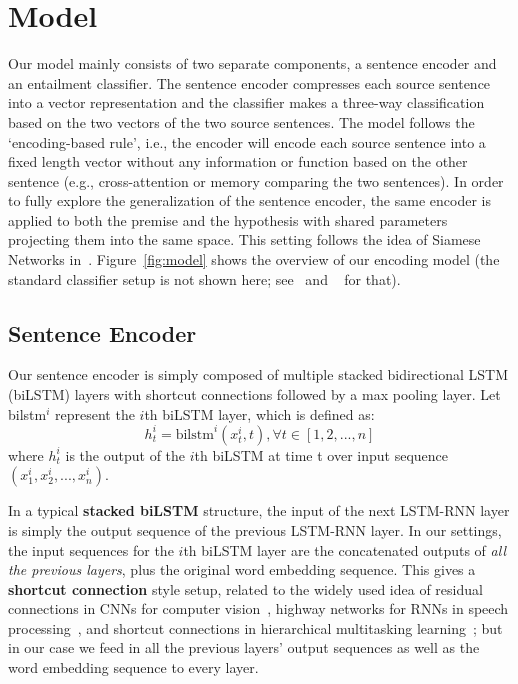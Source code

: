 \documentclass[11pt,letterpaper]{article}
\begin{document}

\section{Model}
Our model mainly consists of two separate components, a sentence encoder and an entailment classifier. The sentence encoder compresses each source sentence into a vector representation and the classifier makes a three-way classification based on the two vectors of the two source sentences. The model follows the `encoding-based rule', i.e., the encoder will encode each source sentence into a fixed length vector without any information or function based on the other sentence (e.g., cross-attention or memory comparing the two sentences). In order to fully explore the generalization of the sentence encoder, the same encoder is applied to both the premise and the hypothesis with shared parameters projecting them into the same space. This setting follows the idea of Siamese Networks in~. Figure~\ref{fig:model} shows the overview of our encoding model (the standard classifier setup is not shown here; see~ and ~ for that).



\subsection{Sentence Encoder}
Our sentence encoder is simply composed of multiple stacked bidirectional LSTM (biLSTM) layers with shortcut connections followed by a max pooling layer.
Let bilstm$^i$ represent the $i$th biLSTM layer, which is defined as:
%
\begin{equation}
h_t^i = \mathrm{bilstm}^i(x_t^i,t),\forall t \in [1,2,...,n]
\end{equation}
%
where $h_t^i$ is the output of the $i$th biLSTM at time t over input sequence $(x_1^i, x_2^i, ..., x_n^i)$.

In a typical \textbf{stacked biLSTM} structure, the input of the next LSTM-RNN layer is simply the output sequence of the previous LSTM-RNN layer. In our settings, the input sequences for the $i$th biLSTM layer are the concatenated outputs of \emph{all the previous layers}, plus the original word embedding sequence. This gives a \textbf{shortcut connection} style setup, related to the widely used idea of residual connections in CNNs for computer vision~\cite{he2016deep}, highway networks for RNNs in speech processing~\cite{zhang2016highway}, and shortcut connections in hierarchical multitasking learning~\cite{hashimoto2016joint}; but in our case we feed in all the previous layers' output sequences as well as the word embedding sequence to every layer.
\end{document}
